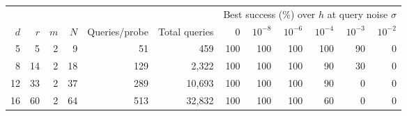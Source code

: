 \begin{tabular}{r r r r r r rrrrrr}
\toprule
& & & & & & \multicolumn{6}{c}{Best success (\%) over $h$ at query noise $\sigma$}\\
\cmidrule(lr){7-12}
$d$ & $r$ & $m$ & $N$ & Queries/probe & Total queries & 0 & $10^{-8}$ & $10^{-6}$ & $10^{-4}$ & $10^{-3}$ & $10^{-2}$\\
\midrule
5 & 5 & 2 & 9 & 51 & 459 & 100 & 100 & 100 & 100 & 90 & 0 \\
8 & 14 & 2 & 18 & 129 & 2{,}322 & 100 & 100 & 100 & 90 & 30 & 0 \\
12 & 33 & 2 & 37 & 289 & 10{,}693 & 100 & 100 & 100 & 90 & 0 & 0 \\
16 & 60 & 2 & 64 & 513 & 32{,}832 & 100 & 100 & 100 & 60 & 0 & 0 \\
\bottomrule
\end{tabular}
